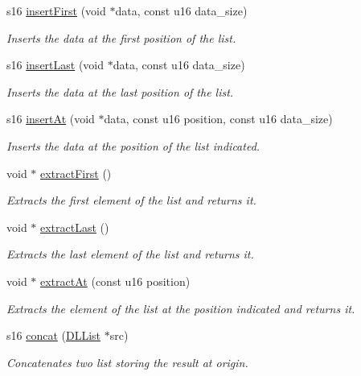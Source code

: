 \begin{DoxyCompactItemize}
s16 \hyperlink{class_d_l_list_ab9afb99a506f5c2edd2a08e20db36778}{insert\+First} (void $\ast$data, const u16 data\+\_\+size)
\begin{DoxyCompactList}\small\item\em Inserts the data at the first position of the list. \end{DoxyCompactList}\item 
s16 \hyperlink{class_d_l_list_a926e2bcf76d4372c1832e79ee1fb3097}{insert\+Last} (void $\ast$data, const u16 data\+\_\+size)
\begin{DoxyCompactList}\small\item\em Inserts the data at the last position of the list. \end{DoxyCompactList}\item 
s16 \hyperlink{class_d_l_list_a7e19cb0bd835bf2d5f8be47119d755b6}{insert\+At} (void $\ast$data, const u16 position, const u16 data\+\_\+size)
\begin{DoxyCompactList}\small\item\em Inserts the data at the position of the list indicated. \end{DoxyCompactList}\item 
void $\ast$ \hyperlink{class_d_l_list_a2ca9b602004ecf213e67092d367f6cfe}{extract\+First} ()
\begin{DoxyCompactList}\small\item\em Extracts the first element of the list and returns it. \end{DoxyCompactList}\item 
void $\ast$ \hyperlink{class_d_l_list_a4e9d658a550a11331950f8b01f0ca43f}{extract\+Last} ()
\begin{DoxyCompactList}\small\item\em Extracts the last element of the list and returns it. \end{DoxyCompactList}\item 
void $\ast$ \hyperlink{class_d_l_list_a026e0208727f84a6a4781966bf6a21da}{extract\+At} (const u16 position)
\begin{DoxyCompactList}\small\item\em Extracts the element of the list at the position indicated and returns it. \end{DoxyCompactList}\item 
s16 \hyperlink{class_d_l_list_a69006862d24e4d69a3dd87b93d5025ef}{concat} (\hyperlink{class_d_l_list}{D\+L\+List} $\ast$src)
\begin{DoxyCompactList}\small\item\em Concatenates two list storing the result at origin. \end{DoxyCompactList}\item 

\end{DoxyCompactItemize}
